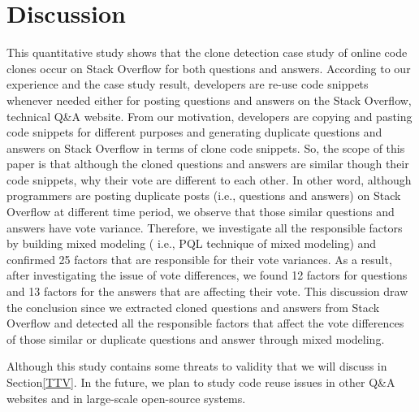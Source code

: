 \documentclass[conference]{IEEEtran}
\begin{document}
 \section{Discussion}
This quantitative study shows that the clone detection case study of online code clones occur on Stack Overflow for both questions and answers. According to our experience and the case study result, developers are re-use code snippets whenever needed either for posting questions and answers on the Stack Overflow, technical Q\&A website. From our motivation, developers are copying and pasting code snippets for different purposes and generating duplicate questions and answers on Stack Overflow in terms of clone code snippets. So, the scope of this paper is that although the cloned questions and answers are similar though their code snippets, why their vote are different to each other. In other word, although programmers are posting duplicate posts (i.e., questions and answers) on Stack Overflow at different time period, we observe that those similar questions and answers have vote variance. Therefore, we investigate all the responsible factors by building mixed modeling ( i.e., PQL technique of mixed modeling) and confirmed 25 factors that are responsible for their vote variances. As a result, after investigating the issue of vote differences, we found 12 factors for questions and 13 factors for the answers that are affecting their vote. This discussion draw the conclusion since we extracted cloned questions and answers from Stack Overflow and detected all the responsible factors that affect the vote differences of those similar or duplicate questions and answer through mixed modeling.\newline     


Although this study contains some threats to validity that we will discuss in Section\ref{TTV}. In the future, we plan to study code reuse issues in other Q\&A websites and in large-scale open-source systems.
\end{document}
